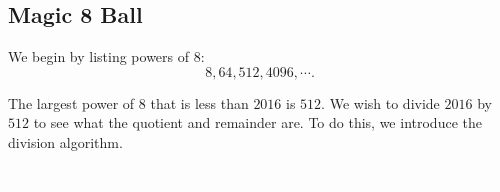 \clearpage

\subsection*{Magic 8 Ball}

We begin by listing powers of $8$:  $$8, 64, 512, 4096, \cdots.$$  

The largest power of $8$ that is less than $2016$ is $512$. We wish to divide $2016$ by $512$ to see what the quotient and remainder are. To do this, we introduce the division algorithm.


\clearpage
\thispagestyle{empty} %
\textcolor{white}{\cite{a:1}, \cite{me:1}}



\clearpage






